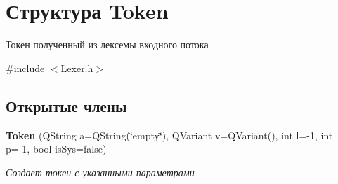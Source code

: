 \section{Структура \-Token}
\label{structToken}


Токен полученный из лексемы входного потока  




{\ttfamily \#include $<$\-Lexer.\-h$>$}

\subsection*{Открытые члены}
\begin{DoxyCompactItemize}
\item 
{\bf \-Token} (\-Q\-String a=\-Q\-String(\char`\"{}empty\char`\"{}), \-Q\-Variant v=\-Q\-Variant(), int l=-\/1, int p=-\/1, bool is\-Sys=false)
\begin{DoxyCompactList}\small\item\em Создает токен с указанными параметрами \end{DoxyCompactList}\end{DoxyCompactItemize}
